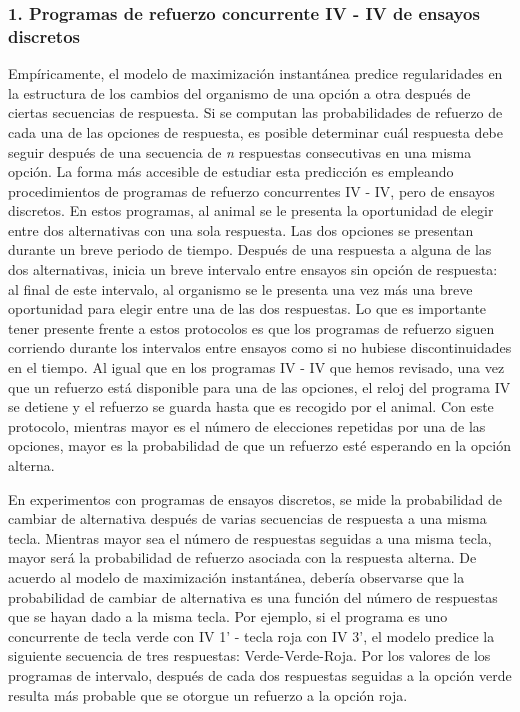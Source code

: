 \documentclass[
  a4paper,
  DIV=11,
  numbers=noendperiod]{scrreprt}
\begin{document}
\subsubsection{1. Programas de refuerzo concurrente IV - IV de ensayos
discretos}\label{programas-de-refuerzo-concurrente-iv---iv-de-ensayos-discretos}

Empíricamente, el modelo de maximización instantánea predice
regularidades en la estructura de los cambios del organismo de una
opción a otra después de ciertas secuencias de respuesta. Si se computan
las probabilidades de refuerzo de cada una de las opciones de respuesta,
es posible determinar cuál respuesta debe seguir después de una
secuencia de \emph{n} respuestas consecutivas en una misma opción. La
forma más accesible de estudiar esta predicción es empleando
procedimientos de programas de refuerzo concurrentes IV - IV, pero de
ensayos discretos. En estos programas, al animal se le presenta la
oportunidad de elegir entre dos alternativas con una sola respuesta. Las
dos opciones se presentan durante un breve periodo de tiempo. Después de
una respuesta a alguna de las dos alternativas, inicia un breve
intervalo entre ensayos sin opción de respuesta: al final de este
intervalo, al organismo se le presenta una vez más una breve oportunidad
para elegir entre una de las dos respuestas. Lo que es importante tener
presente frente a estos protocolos es que los programas de refuerzo
siguen corriendo durante los intervalos entre ensayos como si no hubiese
discontinuidades en el tiempo. Al igual que en los programas IV - IV que
hemos revisado, una vez que un refuerzo está disponible para una de las
opciones, el reloj del programa IV se detiene y el refuerzo se guarda
hasta que es recogido por el animal. Con este protocolo, mientras mayor
es el número de elecciones repetidas por una de las opciones, mayor es
la probabilidad de que un refuerzo esté esperando en la opción alterna.

En experimentos con programas de ensayos discretos, se mide la
probabilidad de cambiar de alternativa después de varias secuencias de
respuesta a una misma tecla. Mientras mayor sea el número de respuestas
seguidas a una misma tecla, mayor será la probabilidad de refuerzo
asociada con la respuesta alterna. De acuerdo al modelo de maximización
instantánea, debería observarse que la probabilidad de cambiar de
alternativa es una función del número de respuestas que se hayan dado a
la misma tecla. Por ejemplo, si el programa es uno concurrente de tecla
verde con IV 1' - tecla roja con IV 3', el modelo predice la siguiente
secuencia de tres respuestas: Verde-Verde-Roja. Por los valores de los
programas de intervalo, después de cada dos respuestas seguidas a la
opción verde resulta más probable que se otorgue un refuerzo a la opción
roja.
\end{document}
